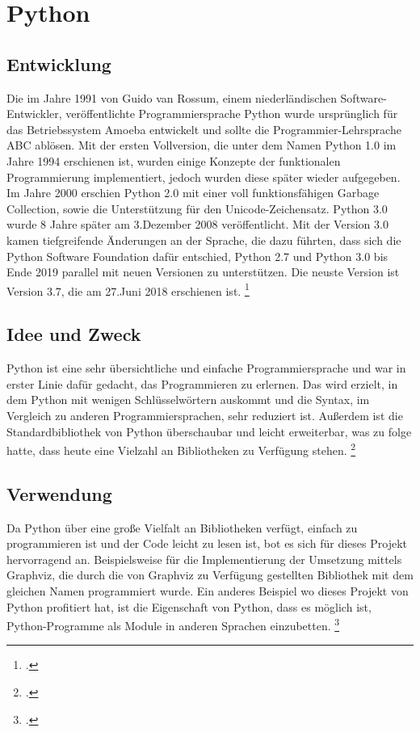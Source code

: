 \section{Python}
\fib{}
\subsection{Entwicklung}

\noindent
Die im Jahre 1991 von Guido van Rossum, einem niederländischen Software-Entwickler, veröffentlichte Programmiersprache Python wurde ursprünglich für das Betriebssystem Amoeba entwickelt und sollte die Programmier-Lehrsprache ABC ablösen.
Mit der ersten Vollversion, die unter dem Namen Python 1.0 im Jahre 1994 erschienen ist, wurden einige Konzepte der funktionalen Programmierung implementiert, jedoch wurden diese später wieder aufgegeben. 
Im Jahre 2000 erschien Python 2.0 mit einer voll funktionsfähigen Garbage Collection, sowie die Unterstützung für den Unicode-Zeichensatz.
Python 3.0 wurde 8 Jahre später am 3.Dezember 2008 veröffentlicht. Mit der Version 3.0 kamen tiefgreifende Änderungen an der Sprache, die dazu führten, dass sich die Python Software Foundation dafür entschied, Python 2.7 und Python 3.0 bis Ende 2019 parallel mit neuen Versionen zu unterstützen. 
Die neuste Version ist Version 3.7, die am 27.Juni 2018 erschienen ist.
\footcite{noauthor_history_nodate}

\subsection{Idee und Zweck}

\noindent
Python ist eine sehr übersichtliche und einfache Programmiersprache und war in erster Linie dafür gedacht, das Programmieren zu erlernen. Das wird erzielt, in dem Python mit wenigen Schlüsselwörtern auskommt und die Syntax, im Vergleich zu anderen Programmiersprachen, sehr reduziert ist. Außerdem ist die Standardbibliothek von Python überschaubar und leicht erweiterbar, was zu folge hatte, dass heute eine Vielzahl an Bibliotheken zu Verfügung stehen. 
\footcite{noauthor_general_nodate}

\subsection{Verwendung}

\noindent
Da Python über eine große Vielfalt an Bibliotheken verfügt, einfach zu programmieren ist und der Code leicht zu lesen ist, bot es sich für dieses Projekt hervorragend an. Beispielsweise für die Implementierung der Umsetzung mittels Graphviz, die durch die von Graphviz zu Verfügung gestellten Bibliothek mit dem gleichen Namen programmiert wurde.
Ein anderes Beispiel wo dieses Projekt von Python profitiert hat, ist die Eigenschaft von Python, dass es möglich ist, Python-Programme als Module in anderen Sprachen einzubetten.
\footcite{noauthor_integrateddevelopmentenvironments_nodate}
